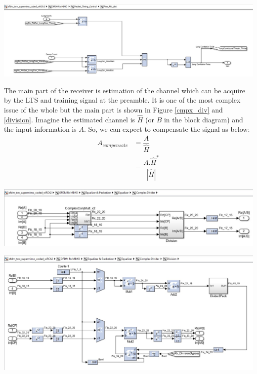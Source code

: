 \begin{center}
\includegraphics[width=\textwidth]{content/fig/fine_packetDetect.JPG}
\label{fine_packetDetect}
\end{center}

The main part of the receiver is estimation of the channel which can be acquire by the LTS and training signal at the preamble. It is one of the most complex issue of the whole but the main part is shown in Figure \ref{cmpx_div} and \ref{division}. Imagine the estimated channel is $\hat{H}$ (or $B$ in the block diagram) and the input information is $A$. So, we can expect to compensate the signal as below:\\

\begin{equation} \label{channel_Comp}
\begin{split}
A_{compensate} & = \dfrac{A}{\hat{H}}\\
&= \dfrac{A.{\hat{H}}^*}{|\hat{H}|}
\end{split}
\end{equation}

\begin{center}
\includegraphics[width=\textwidth]{content/fig/cmpx_div.JPG}
\label{cmpx_div}
\end{center}

\begin{center}
\includegraphics[width=\textwidth]{content/fig/division.JPG}
\label{division}
\end{center}


